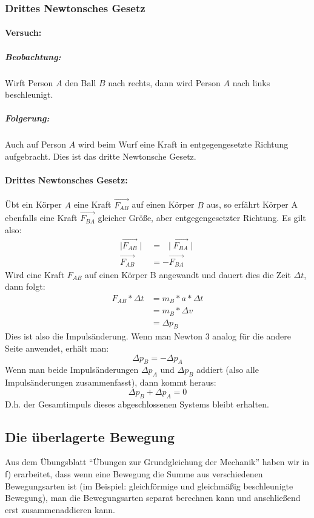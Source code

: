 \documentclass[12pt]{article}
\numberwithin{equation}{subsection}
\begin{document}
	\subsubsection{Drittes Newtonsches Gesetz}
	\paragraph{Versuch:}
	\subparagraph{Beobachtung:}
	Wirft Person $ A $ den Ball $ B $ nach rechts, dann wird Person $ A $ nach links beschleunigt.
	\subparagraph{Folgerung:}
	Auch auf Person $ A $ wird beim Wurf eine Kraft in entgegengesetzte Richtung aufgebracht. Dies ist das dritte Newtonsche Gesetz.
	\paragraph{Drittes Newtonsches Gesetz:}
	Übt ein Körper $ A $ eine Kraft $ \vec{F_{AB}} $ auf einen Körper $ B $ aus, so erfährt Körper A ebenfalls eine Kraft $ \vec{F_{BA}} $ gleicher Größe, aber entgegengesetzter Richtung. Es gilt also:
	\begin{align}
		\mid\vec{F_{AB}}\mid &= \ \ \mid\vec{F_{BA}}\mid\\
		\vec{F_{AB}} &= -\vec{F_{BA}}
	\end{align}
	Wird eine Kraft $ F_{AB} $ auf einen Körper B angewandt und dauert dies die Zeit $ \Delta t $, dann folgt:
	\begin{align}
		F_{AB}*\Delta t &= m_B*a*\Delta t\\
		&= m_B*\Delta v\\
		&= \Delta p_B
	\end{align}
	Dies ist also die Impulsänderung. Wenn man Newton 3 analog für die andere Seite anwendet, erhält man:
	\begin{equation}
		\Delta p_B = -\Delta p_A
	\end{equation}
	Wenn man beide Impulsänderungen $ \Delta p_A $ und $ \Delta p_B $ addiert (also alle Impulsänderungen zusammenfasst), dann kommt heraus:
	\begin{equation}
		\Delta p_B+\Delta p_A = 0
	\end{equation}
	D.h. der Gesamtimpuls dieses abgeschlossenen Systems bleibt erhalten.
	
	\subsection{Die überlagerte Bewegung}
	Aus dem Übungsblatt ``Übungen zur Grundgleichung der Mechanik'' haben wir in f) erarbeitet, dass wenn eine Bewegung die Summe aus verschiedenen Bewegungsarten ist (im Beispiel: gleichförmige und gleichmäßig beschleunigte Bewegung), man die Bewegungsarten separat berechnen kann und anschließend erst zusammenaddieren kann.
\end{document}
